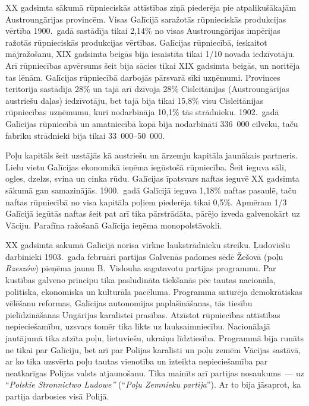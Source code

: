 \documentclass[twoside,a5paper,12pt,fleqn,openany]{extbook}
\newcommand{\pltxti}[1]{\textit{\textpolish{#1}}}
\begin{document}
 XX gadsimta sākumā rūpnieciskās attīstības ziņā piederēja pie atpalikušākajām Austroungārijas provincēm. Visas Galīcijā saražotās rūpnieciskās produkcijas vērtība 1900.~gadā sastādīja tikai 2,14\% no visas Austroungārijas impērijas ražotās rūpnieciskās produkcijas vērtības. Galīcijas rūpniecībā, ieskaitot mājražošanu, XIX gadsimta beigās bija iesaistīta tikai 1/10 novada iedzīvotāju. Arī rūpniecības apvērsums šeit bija sācies tikai XIX gadsimta beigās, un noritēja tas lēnām. Galīcijas rūpniecībā darbojās pārsvarā sīki uzņēmumi. Provinces teritorija sastādīja 28\% un tajā arī dzīvoja 28\% Cisleitānijas (Austroungārijas austriešu daļas) iedzīvotāju, bet tajā bija tikai 15,8\% visu Cisleitānijas rūpniecības uzņēmumu, kuri nodarbināja 10,1\% tās strādnieku. 1902.~gadā Galīcijas rūpniecībā un amatniecībā kopā bija nodarbināti 336~000 cilvēku, taču fabriku strādnieki bija tikai 33~000--50~000.

Poļu kapitāls šeit uzstājās kā austriešu un ārzemju kapitāla jaunākais partneris. Lielu vietu Galīcijas ekonomikā ieņēma iegūstošā rūpniecība. Šeit ieguva sāli, ogles, dzelzs, svina un cinka rūdu. Galīcijas īpatsvars naftas ieguvē XX gadsimta sākumā gan samazinājās. 1900.~gadā Galīcijā ieguva 1,18\% naftas pasaulē, taču naftas rūpniecībā no visa kapitāla poļiem piederēja tikai 0,5\%. Apmēram 1/3 Galīcijā iegūtās naftas šeit pat arī tika pārstrādāta, pārējo izveda galvenokārt uz Vāciju. Parafīna ražošanā Galīcija ieņēma monopolstāvokli.

XX gadsimta sakumā Galīcijā norisa virkne laukstrādnieku streiku. Ļudoviešu darbinieki 1903.~gada februārī partijas Galvenās padomes sēdē Žešovā (poļu \pltxti{Rzeszów}) pieņēma jaunu B.~Vislouha sagatavotu partijas programmu. Par kustības galveno principu tika pasludināta tiekšanās pēc tautas nacionāla, politiska, ekonomiska un kulturāla pacēluma. Programma saturēja demokrātiskas vēlēšanu reformas, Galīcijas autonomijas paplašināšanas, tās tiesību pielīdzināšanas Ungārijas karalistei prasības. Atzīstot rūpniecības attīstības nepieciešamību, uzsvars tomēr tika likts uz lauksaimniecību. Nacionālajā jautājumā tika atzīta poļu, lietuviešu, ukraiņu līdztiesība. Programmā bija runāts ne tikai par Galīciju, bet arī par Polijas karalisti un poļu zemēm Vācijas sastāvā, ar ko tika uzsvērta poļu tautas vienotība un izteikta nepieciešamība par neatkarīgas Polijas valsts atjaunošanu. Tika mainīts arī partijas nosaukums~--- uz ``\pltxti{Polskie Stronnictwo Ludowe''} (``\pltxti{Poļu Zemnieku partija}''). Ar to bija jāsaprot, ka partija darbosies visā Polijā.
\end{document}

